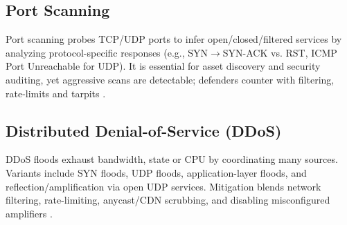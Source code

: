 \subsection{Port Scanning}
Port scanning probes TCP/UDP ports to infer open/closed/filtered services by
analyzing protocol-specific responses (e.g., SYN$\rightarrow$SYN-ACK vs. RST,
ICMP Port Unreachable for UDP). It is essential for asset discovery and
security auditing, yet aggressive scans are detectable; defenders counter with
filtering, rate-limits and tarpits \cite{lyon:nmap}.

\subsection{Distributed Denial-of-Service (DDoS)}
DDoS floods exhaust bandwidth, state or CPU by coordinating many sources.
Variants include SYN floods, UDP floods, application-layer floods, and
reflection/amplification via open UDP services. Mitigation blends network
filtering, rate-limiting, anycast/CDN scrubbing, and disabling misconfigured
amplifiers \cite{mirkovic2004taxonomy}.

%
%


